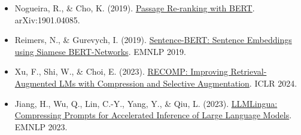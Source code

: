 \begin{itemize}
\item
  Nogueira, R., \& Cho, K. (2019). \href{https://arxiv.org/abs/1901.04085}{Passage Re-ranking with BERT}. arXiv:1901.04085.
\item
  Reimers, N., \& Gurevych, I. (2019). \href{https://arxiv.org/abs/1908.10084}{Sentence-BERT: Sentence Embeddings using Siamese BERT-Networks}. EMNLP 2019.
\item
  Xu, F., Shi, W., \& Choi, E. (2023). \href{https://arxiv.org/abs/2310.04408}{RECOMP: Improving Retrieval-Augmented LMs with Compression and Selective Augmentation}. ICLR 2024.
\item
  Jiang, H., Wu, Q., Lin, C.-Y., Yang, Y., \& Qiu, L. (2023). \href{https://arxiv.org/abs/2310.05736}{LLMLingua: Compressing Prompts for Accelerated Inference of Large Language Models}. EMNLP 2023.
\end{itemize}

\clearpage
